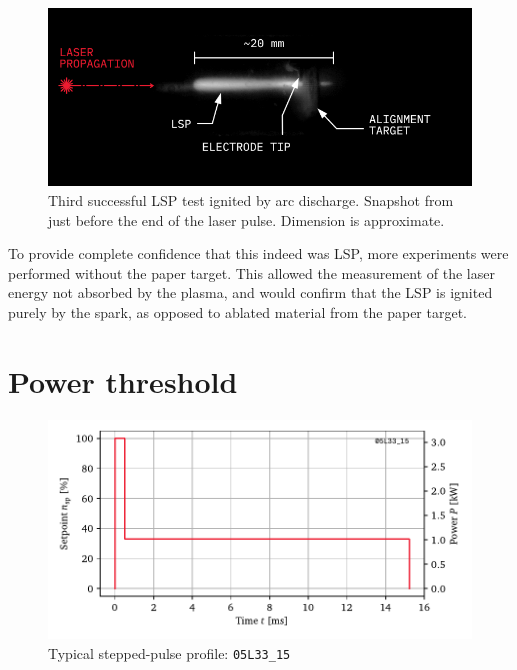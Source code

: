         \begin{figure}[h]
            \centering
            \includegraphics[]{assets/3 design/LSP3_annotated.jpg}
            \caption[Third successful LSP test ignited by arc discharge]{Third successful LSP test ignited by arc discharge. Snapshot from just before the end of the laser pulse. Dimension is approximate.}
            \label{fig:lsp3}
        \end{figure}

        To provide complete confidence that this indeed was LSP, more experiments were performed without the paper target. This allowed the measurement of the laser energy not absorbed by the plasma, and would confirm that the LSP is ignited purely by the spark, as opposed to ablated material from the paper target. 

    \section{Power threshold}
    
    

    

    \begin{figure}[h]
        \centering
        \includegraphics[]{assets/5 results/pulse_profile.pdf}
        \caption{Typical stepped-pulse profile: \texttt{05L33\_15}}
        \label{fig:pulse_stepProfile}
    \end{figure}


